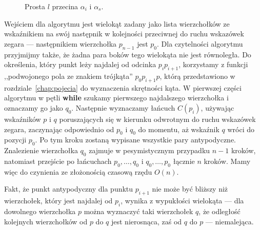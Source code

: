 \begin{figure}[tp]
  \caption{Prosta $l$ przecina $\alpha_i$ i $\alpha_s$.\label{fig:diameter}}
\end{figure}


Wejściem dla algorytmu jest wielokąt zadany jako lista wierzchołków ze
wskaźnikiem na swój następnik w kolejności przeciwnej do ruchu
wskazówek zegara --- następnikiem wierzchołka $p_{n-1}$ jest
$p_0$. Dla czytelności algorytmu przyjmijmy także, że żadna para boków
tego wielokąta nie jest równoległa. Do określenia, który punkt leży
najdalej od odcinka $p_{i}p_{i+1}$, korzystamy z funkcji ,,podwojonego
pola ze znakiem trójkąta'' $p_{0}p_{i+1}p$, którą przedstawiono w
rozdziale~\ref{chap:pojecia} do wyznaczenia skrętności kąta. W
pierwszej części algorytmu w pętli \textbf{while} szukamy pierwszego
najdalszego wierzchołka i oznaczamy go jako $q_0$. Następnie
wyznaczamy łańcuch $C(p_i)$, używając wskaźników $p$ i $q$
poruszających się w kierunku odwrotnym do ruchu wskazówek zegara,
zaczynając odpowiednio od $p_0$ i $q_0$ do momentu, aż wskaźnik $q$
wróci do pozycji $p_0$. Po tym kroku zostaną wypisane wszystkie pary
antypodyczne. Znalezienie wierzchołka $q_0$ zajmuje w pesymistycznym
przypadku $n-1$ kroków, natomiast przejście po łańcuchach $p_{0},
\ldots, q_{0}$ i $q_{0}, \ldots, p_{0}$ łącznie $n$ kroków. Mamy więc
do czynienia ze złożonością czasową rzędu $O(n)$.

Fakt, że punkt antypodyczny dla punktu $p_{i+1}$ nie może być bliższy
niż wierzchołek, który jest najdalej od $p_i$, wynika z wypukłości
wielokąta --- dla dowolnego wierzchołka $p$ można wyznaczyć taki
wierzchołek $q$, że odległość kolejnych wierzchołków od $p$ do $q$
jest nierosnąca, zaś od $q$ do $p$ --- niemalejąca.


